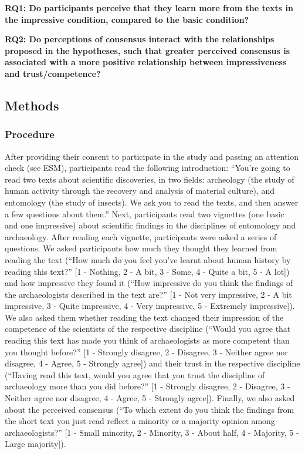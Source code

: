 \documentclass[
  doc,floatsintext]{apa6}
\begin{document}
\textbf{RQ1: Do participants perceive that they learn more from the texts in the impressive condition, compared to the basic condition?}

\textbf{RQ2: Do perceptions of consensus interact with the relationships proposed in the hypotheses, such that greater perceived consensus is associated with a more positive relationship between impressiveness and trust/competence?}

\subsection{Methods}\label{methods}

\subsubsection{Procedure}\label{procedure}

After providing their consent to participate in the study and passing an attention check (see ESM), participants read the following introduction: ``You're going to read two texts about scientific discoveries, in two fields: archeology (the study of human activity through the recovery and analysis of material culture), and entomology (the study of insects). We ask you to read the texts, and then answer a few questions about them.'' Next, participants read two vignettes (one basic and one impressive) about scientific findings in the disciplines of entomology and archaeology. After reading each vignette, participants were asked a series of questions. We asked participants how much they thought they learned from reading the text (``How much do you feel you've learnt about human history by reading this text?'' {[}1 - Nothing, 2 - A bit, 3 - Some, 4 - Quite a bit, 5 - A lot{]}) and how impressive they found it (``How impressive do you think the findings of the archaeologists described in the text are?'' {[}1 - Not very impressive, 2 - A bit impressive, 3 - Quite impressive, 4 - Very impressive, 5 - Extremely impressive{]}). We also asked them whether reading the text changed their impression of the competence of the scientists of the respective discipline (``Would you agree that reading this text has made you think of archaeologists as more competent than you thought before?'' {[}1 - Strongly disagree, 2 - Disagree, 3 - Neither agree nor disagree, 4 - Agree, 5 - Strongly agree{]}) and their trust in the respective discipline (``Having read this text, would you agree that you trust the discipline of archaeology more than you did before?'' {[}1 - Strongly disagree, 2 - Disagree, 3 - Neither agree nor disagree, 4 - Agree, 5 - Strongly agree{]}). Finally, we also asked about the perceived consensus (``To which extent do you think the findings from the short text you just read reflect a minority or a majority opinion among archaeologists?'' {[}1 - Small minority, 2 - Minority, 3 - About half, 4 - Majority, 5 - Large majority{]}).
\end{document}
